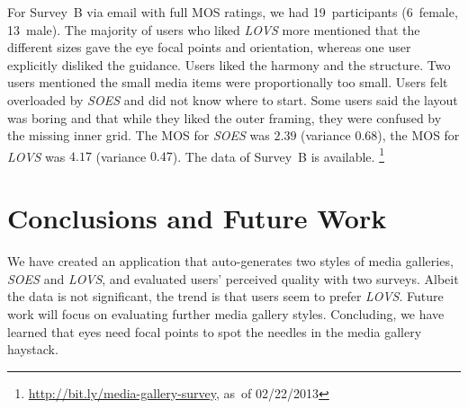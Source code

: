 \documentclass{sig-alternate}
\newcommand{\inlinelistingsize}{\fontsize{8pt}{11pt}}
\let\oldurl\url
\renewcommand{\url}[1]{\inlinelistingsize\oldurl{#1}}
\begin{document}
For Survey~B via email with full MOS ratings,
we had 19~participants (6~female, 13~male).
The majority of users who liked \emph{LOVS} more
mentioned that the different sizes
gave the eye focal points and orientation,
whereas one user explicitly disliked the guidance.
Users liked the harmony and the structure.
Two users mentioned the small media items were proportionally too small.
Users felt overloaded by \emph{SOES} and did not know where to start.
Some users said the layout was boring and that
while they liked the outer framing,
they were confused by the missing inner grid.
The MOS for \emph{SOES} was $2.39$ (variance $0.68$),
the MOS for \emph{LOVS} was $4.17$ (variance $0.47$).
The data of Survey~B is available.%
\footnote{\url{http://bit.ly/media-gallery-survey},
as~of 02/22/2013}

\section{Conclusions and Future Work}

We have created an application that auto-generates 
two styles of media galleries, \emph{SOES} and \emph{LOVS},
and evaluated users' perceived quality with two surveys. 
Albeit the data is not significant, the trend is that users
seem to prefer \emph{LOVS}.
Future work will focus on evaluating further media gallery styles.
Concluding, we have learned that eyes need focal points
to spot the needles in the media gallery haystack.

\footnotesize{
}
\end{document}
